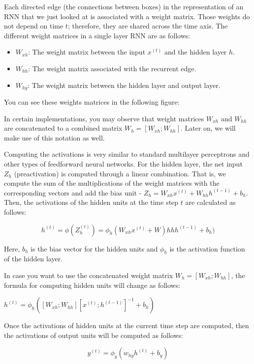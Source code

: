 \documentclass[11pt]{article}
\providecommand{\tightlist}{%
      \setlength{\itemsep}{0pt}\setlength{\parskip}{0pt}}
\begin{document}
Each directed edge (the connections between boxes) in the representation
of an RNN that we just looked at is associated with a weight matrix.
Those weights do not depend on time \(t\); therefore, they are shared
across the time axis. The different weight matrices in a single layer
RNN are as follows:

\begin{itemize}
\tightlist
\item
  \(W_{xh}\): The weight matrix between the input \(x^{(t)}\) and the
  hidden layer \(h\).
\item
  \(W_{hh}\): The weight matrix associated with the recurrent edge.
\item
  \(W_{hy}\): The weight matrix between the hidden layer and output
  layer.
\end{itemize}

You can see these weights matrices in the following figure:

    In certain implementations, you may observe that weight matrices
\(W_{xh}\) and \(W_{hh}\) are concatenated to a combined matrix
\(W_h = [W_{xh}; W_{hh}]\). Later on, we will make use of this notation
as well.

Computing the activations is very similar to standard multilayer
perceptrons and other types of feedforward neural networks. For the
hidden layer, the net input \(Z_h\) (preactivation) is computed through
a linear combination. That is, we compute the sum of the multiplications
of the weight matrices with the corresponding vectors and add the bias
unit - \(Z_h = W_{xh}x^{(t)} + W_{hh}h^{(t-1)} + b_h\). Then, the
activations of the hidden units at the time step \(t\) are calculated as
follows:

\[h^{(t)} = \phi(Z_h^{(t)}) = \phi_h (W_{xh}x^{(t)} + W){hh}h^{(t-1)} + b_h)\]

Here, \(b_h\) is the bias vector for the hidden units and \(\phi_h\) is
the activation function of the hidden layer.

In case you want to use the concatenated weight matrix
\(W_h = [W_{xh}; W_{hh}]\), the formula for computing hidden units will
change as follows:

\(h^{(t)} = \phi_h\left([W_{xh}; W_{hh}][x^{(t)}; h^{(t-1)}]^{-1} + b_h\right)\)

Once the activations of hidden units at the current time step are
computed, then the activations of output units will be computed as
follows:

\[y^{(t)} = \phi_y(w_{hy}h^{(t)} + b_y)\]
\end{document}
